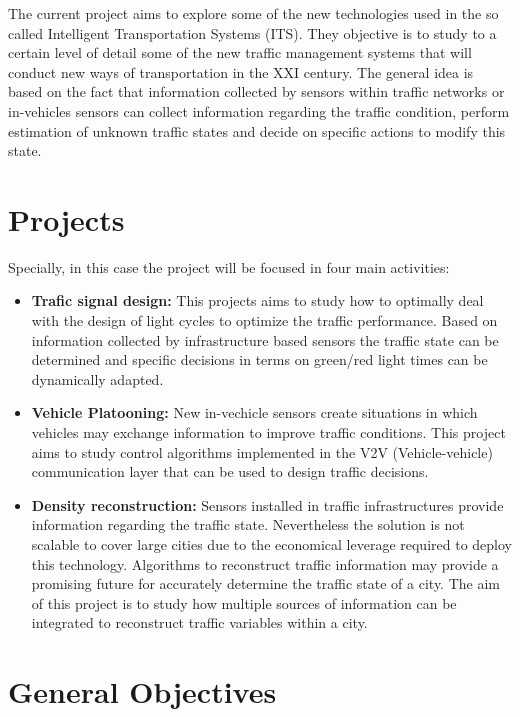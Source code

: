 \documentclass[]{book}
\providecommand{\tightlist}{%
  \setlength{\itemsep}{0pt}\setlength{\parskip}{0pt}}
\theoremstyle{definition}
\theoremstyle{definition}
\theoremstyle{definition}
\theoremstyle{remark}
\begin{document}
The current project aims to explore some of the new technologies used in
the so called Intelligent Transportation Systems (ITS). They objective
is to study to a certain level of detail some of the new traffic
management systems that will conduct new ways of transportation in the
XXI century. The general idea is based on the fact that information
collected by sensors within traffic networks or in-vehicles sensors can
collect information regarding the traffic condition, perform estimation
of unknown traffic states and decide on specific actions to modify this
state.

\hypertarget{projects}{%
\section*{Projects}\label{projects}}

Specially, in this case the project will be focused in four main
activities:

\begin{itemize}
\tightlist
\item
  \textbf{Trafic signal design:} This projects aims to study how to
  optimally deal with the design of light cycles to optimize the traffic
  performance. Based on information collected by infrastructure based
  sensors the traffic state can be determined and specific decisions in
  terms on green/red light times can be dynamically adapted.
\item
  \textbf{Vehicle Platooning:} New in-vechicle sensors create situations
  in which vehicles may exchange information to improve traffic
  conditions. This project aims to study control algorithms implemented
  in the V2V (Vehicle-vehicle) communication layer that can be used to
  design traffic decisions.
\item
  \textbf{Density reconstruction:} Sensors installed in traffic
  infrastructures provide information regarding the traffic state.
  Nevertheless the solution is not scalable to cover large cities due to
  the economical leverage required to deploy this technology. Algorithms
  to reconstruct traffic information may provide a promising future for
  accurately determine the traffic state of a city. The aim of this
  project is to study how multiple sources of information can be
  integrated to reconstruct traffic variables within a city.
\end{itemize}

\hypertarget{general-objectives}{%
\section*{General Objectives}\label{general-objectives}}
\end{document}
